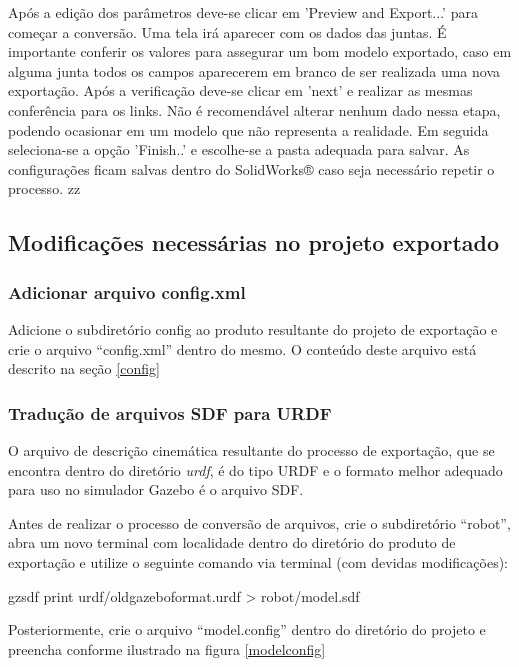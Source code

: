 Após a edição dos parâmetros deve-se clicar em 'Preview and Export...' para começar a conversão. Uma tela irá aparecer com os dados das juntas. É importante conferir os valores para assegurar um bom modelo exportado, caso em alguma junta todos os campos aparecerem em branco de ser realizada uma nova exportação. Após a verificação deve-se clicar em 'next' e realizar as mesmas conferência para os links. Não é recomendável alterar nenhum dado nessa etapa, podendo ocasionar em um modelo que não representa a realidade. Em seguida seleciona-se a opção 'Finish..' e escolhe-se a pasta adequada para salvar. As configurações ficam salvas dentro do SolidWorks® caso seja necessário repetir o processo. zz

\subsection{Modificações necessárias no projeto exportado}

\subsubsection{Adicionar arquivo config.xml} 

Adicione o subdiretório config ao produto resultante do projeto de exportação e crie o arquivo ``config.xml'' dentro do mesmo. O conteúdo deste arquivo está descrito na seção \ref{config} \\

\subsubsection{Tradução de arquivos SDF para URDF} 

O arquivo de descrição cinemática resultante do processo de exportação, que se encontra dentro do diretório \textit{urdf}, é do tipo URDF e o formato melhor adequado para uso no simulador Gazebo é o arquivo SDF. 

Antes de realizar o processo de conversão de arquivos, crie o subdiretório ``robot'', abra um novo terminal com localidade dentro do diretório do produto de exportação e utilize o seguinte comando via terminal (com devidas modificações):

\begin{bashcode}
gzsdf print urdf/oldgazeboformat.urdf > robot/model.sdf
\end{bashcode}

Posteriormente, crie o arquivo ``model.config'' dentro do diretório do projeto e preencha conforme ilustrado na figura \ref{modelconfig}

